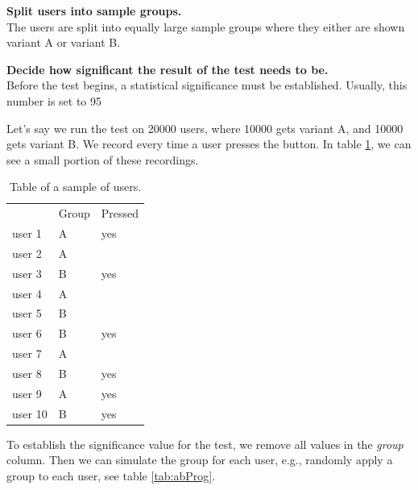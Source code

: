 \textbf{Split users into sample groups.}\\
The users are split into equally large sample groups where they either are shown variant A or variant B. 

\textbf{Decide how significant the result of the test needs to be.}\\
Before the test begins, a statistical significance must be established. Usually, this number is set to 95%

Let's say we run the test on 20000 users, where 10000 gets variant A, and 10000 gets variant B. We record every time a user presses the button. In table \ref{tab:ab}, we can see a small portion of these recordings.

\begin{table}[H]
\begin{tabular}{lll}
        & Group & Pressed \\
user 1  & A     & yes     \\
user 2  & A     &         \\
user 3  & B     & yes     \\
user 4  & A     &         \\
user 5  & B     &         \\
user 6  & B     & yes     \\
user 7  & A     &         \\
user 8  & B     & yes     \\
user 9  & A     & yes     \\
user 10 & B     & yes    
\end{tabular}
\caption{Table of a sample of users.}
\label{tab:ab}
\end{table}

To establish the significance value for the test, we remove all values in the \textit{group} column. Then we can simulate the group for each user, e.g., randomly apply a group to each user, see table \ref{tab:abProg}. 

